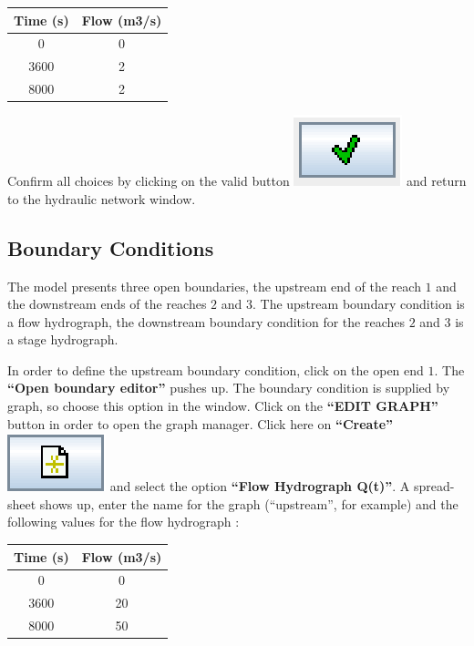 \documentclass[a4paper,12pt]{article}
\begin{document}
\begin{table}[h]
\begin{center}

\begin{tabular}{|c|c|}
\hline 
Time (s) & Flow (m3/s)\tabularnewline
\hline 
\hline 
0 & 0\tabularnewline
\hline 
3600 & 2\tabularnewline
\hline 
8000 & 2\tabularnewline
\hline 
\end{tabular}
\end{center}
\end{table}


Confirm all choices by clicking on the valid button \includegraphics[scale=0.6]{valid}
and return to the hydraulic network window.


\subsection{Boundary Conditions  }

\hspace{0.5cm}The model presents three open boundaries, the upstream end of the
reach $1$ and the downstream ends of the reaches $2$ and $3$. The upstream
boundary condition is a flow hydrograph, the downstream boundary condition
for the reaches $2$ and $3$ is a stage hydrograph.

\vspace{0.5cm}

In order to define the upstream boundary condition, click on the open
end $1$. The \textbf{{}``Open boundary editor''} pushes up. The boundary
condition is supplied by graph, so choose this option in the window.
Click on the \textbf{{}``EDIT GRAPH''} button in order to open the
graph manager. Click here on\textbf{ {}``Create''} \includegraphics[scale=0.6]{new} and
select the option \textbf{{}``Flow Hydrograph Q(t)''}. A spread-sheet
shows up, enter the name for the graph ({}``upstream'', for example)
and the following values for the flow hydrograph : 

\begin{table}[h]
\begin{center}
\begin{tabular}{|c|c|}
\hline 
Time (s) & Flow (m3/s)\tabularnewline
\hline 
\hline 
0 & 0\tabularnewline
\hline 
3600 & 20\tabularnewline
\hline 
8000 & 50\tabularnewline
\hline 
\end{tabular}
\end{center}
\end{table}
\end{document}
